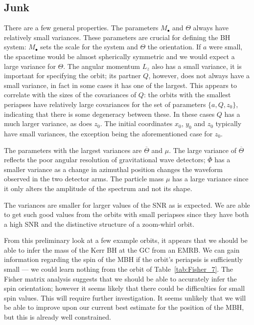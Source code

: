 \documentclass[useAMS,usedcolumn,usegraphicx,usenatbib]{mn2e}
\newcommand{\tabref}[1]{Table~\ref{tab:#1}}
\begin{document}
\subsection{Junk}

There are a few general properties. The parameters $M_\bullet$ and $\Theta$ always have relatively small variances. These parameters are crucial for defining the BH system: $M_\bullet$ sets the scale for the system and $\Theta$ the orientation. If $a$ were small, the spacetime would be almost spherically symmetric and we would expect a large variance for $\Theta$. The angular momentum $L_z$ also has a small variance, it is important for specifying the orbit; its partner $Q$, however, does not always have a small variance, in fact in some cases it has one of the largest. This appears to correlate with the sizes of the covariances of $Q$: the orbits with the smallest periapses have relatively large covariances for the set of parameters $\{a, Q, z_0\}$, indicating that there is some degeneracy between these. In these cases $Q$ has a much larger variance, as does $z_0$. The initial coordinates $x_0$, $y_0$ and $z_0$ typically have small variances, the exception being the aforementioned case for $z_0$.

The parameters with the largest variances are $\overline{\Theta}$ and $\mu$. The large variance of $\overline{\Theta}$ reflects the poor angular resolution of gravitational wave detectors; $\overline{\Phi}$ has a smaller variance as a change in azimuthal position changes the waveform observed in the two detector arms. The particle mass $\mu$ has a large variance since it only alters the amplitude of the spectrum and not its shape.

The variances are smaller for larger values of the SNR as is expected. We are able to get such good values from the orbits with small periapses since they have both a high SNR and the distinctive structure of a zoom-whirl orbit.

From this preliminary look at a few example orbits, it appears that we should be able to infer the mass of the Kerr BH at the GC from an EMRB. We can gain information regarding the spin of the MBH if the orbit's periapsis is sufficiently small --- we could learn nothing from the orbit of \tabref{Fisher_7}. The Fisher matrix analysis suggests that we should be able to accurately infer the spin orientation; however it seems likely that there could be difficulties for small spin values. This will require further investigation. It seems unlikely that we will be able to improve upon our current best estimate for the position of the MBH, but this is already well constrained.
\end{document}
